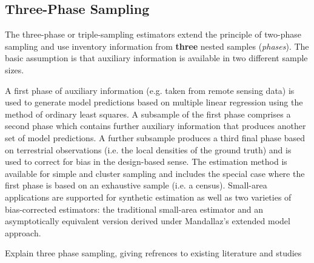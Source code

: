 \documentclass[article]{jss}
\begin{document}
\subsection{Three-Phase Sampling}

The three-phase or triple-sampling estimators extend the principle of two-phase sampling and use inventory information from \textbf{three} nested samples (\textit{phases}). The basic assumption is that auxiliary information is available in two different sample sizes.




A first phase of auxiliary information (e.g. taken from remote sensing data) is used to generate model predictions based on multiple linear regression using the method of ordinary least squares. A subsample of the first phase comprises a second phase which contains further auxiliary information that produces another set of model predictions. A further subsample produces a third final phase based on terrestrial observations (i.e. the local densities of the ground truth) and is used to correct for bias in the design-based sense. The estimation method is available for simple and cluster sampling and includes the special case where the first phase is based on an exhaustive sample (i.e. a census). Small-area applications are supported for synthetic estimation as well as two varieties of bias-corrected estimators: the traditional small-area estimator and an asymptotically equivalent version derived under Mandallaz's extended model approach.


Explain three phase sampling, giving refrences to existing literature and studies
\end{document}

